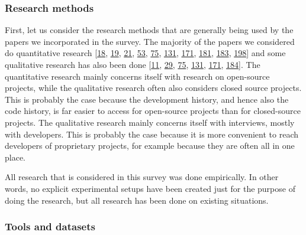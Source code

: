 \documentclass[]{book}
\begin{document}
\subsubsection{Research methods}\label{research-methods-1}

First, let us consider the research methods that are generally being
used by the papers we incorporated in the survey. The majority of the
papers we considered do quantitative research
{[}\protect\hyperlink{ref-baysal2016investigating}{18},
\protect\hyperlink{ref-baysal2013influence}{19},
\protect\hyperlink{ref-beller2014modern}{21},
\protect\hyperlink{ref-czerwonka2015code}{53},
\protect\hyperlink{ref-gousios2014exploratory}{75},
\protect\hyperlink{ref-mcintosh2014impact}{131},
\protect\hyperlink{ref-shimagaki2016study}{171},
\protect\hyperlink{ref-thongtanunam2017review}{181},
\protect\hyperlink{ref-thongtanunam2015should}{183},
\protect\hyperlink{ref-zanjani2016automatically}{198}{]} and some
qualitative research has also been done
{[}\protect\hyperlink{ref-bacchelli2013expectations}{11},
\protect\hyperlink{ref-bird2015lessons}{29},
\protect\hyperlink{ref-gousios2014exploratory}{75},
\protect\hyperlink{ref-mcintosh2014impact}{131},
\protect\hyperlink{ref-shimagaki2016study}{171},
\protect\hyperlink{ref-thongtanunam2014reda}{184}{]}. The quantitative
research mainly concerns itself with research on open-source projects,
while the qualitative research often also considers closed source
projects. This is probably the case because the development history, and
hence also the code history, is far easier to access for open-source
projects than for closed-source projects. The qualitative research
mainly concerns itself with interviews, mostly with developers. This is
probably the case because it is more convenient to reach developers of
proprietary projects, for example because they are often all in one
place.

All research that is considered in this survey was done empirically. In
other words, no explicit experimental setups have been created just for
the purpose of doing the research, but all research has been done on
existing situations.

\subsubsection{Tools and datasets}\label{tools-and-datasets}
\end{document}
